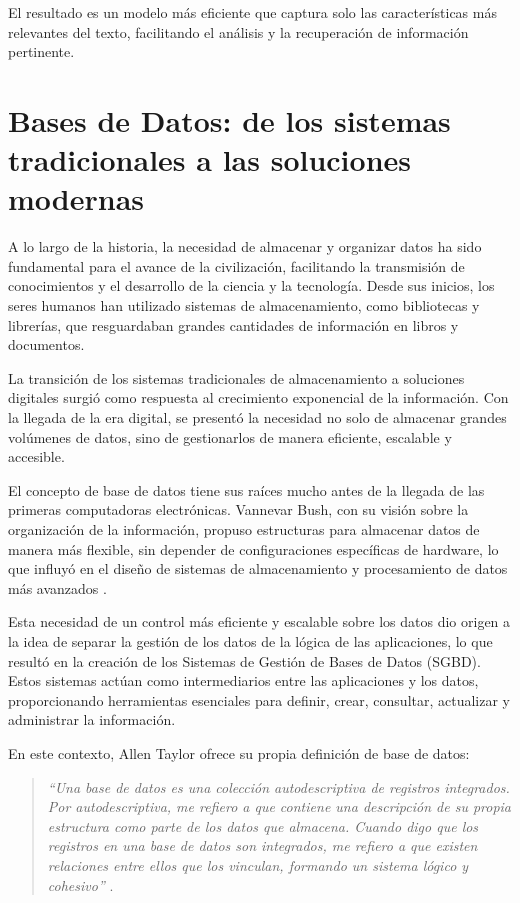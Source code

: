 El resultado es un modelo más eficiente que captura solo las características más 
relevantes del texto, facilitando el análisis y la recuperación de información pertinente.



\section{Bases de Datos: de los sistemas tradicionales a las soluciones modernas}
A lo largo de la historia, la necesidad de almacenar y organizar datos ha sido fundamental 
para el avance de la civilización, facilitando la transmisión de conocimientos y el 
desarrollo de la ciencia y la tecnología. Desde sus inicios, los seres humanos han 
utilizado sistemas de almacenamiento, como bibliotecas y librerías, que resguardaban 
grandes cantidades de información en libros y documentos.

La transición de los sistemas tradicionales de almacenamiento a soluciones digitales 
surgió como respuesta al crecimiento exponencial de la información. Con la llegada 
de la era digital, se presentó la necesidad no solo de almacenar grandes volúmenes 
de datos, sino de gestionarlos de manera eficiente, escalable y accesible.

El concepto de base de datos tiene sus raíces mucho antes de la llegada de las primeras 
computadoras electrónicas. Vannevar Bush, con su visión sobre la organización de la 
información, propuso estructuras para almacenar datos de manera más flexible, 
sin depender de configuraciones específicas de hardware, lo que influyó en el diseño 
de sistemas de almacenamiento y procesamiento de datos más avanzados \cite{Taylor2001}.

Esta necesidad de un control más eficiente y escalable sobre los datos dio origen 
a la idea de separar la gestión de los datos de la lógica de las aplicaciones, 
lo que resultó en la creación de los Sistemas de Gestión de Bases de Datos (SGBD). 
Estos sistemas actúan como intermediarios entre las aplicaciones y los datos, 
proporcionando herramientas esenciales para definir, crear, consultar, actualizar y 
administrar la información.

En este contexto, Allen Taylor ofrece su propia definición de base de datos:

\begin{quote}
    \textit{“Una base de datos es una colección autodescriptiva de registros integrados. Por autodescriptiva, me refiero a que contiene una descripción de su propia estructura como parte de los datos que almacena. Cuando digo que los registros en una base de datos son integrados, me refiero a que existen relaciones entre ellos que los vinculan, formando un sistema lógico y cohesivo”} \cite{Taylor2001_2}.
\end{quote}

